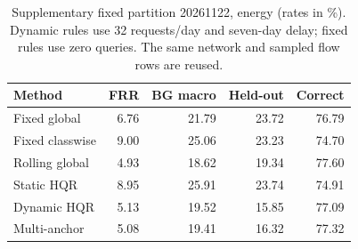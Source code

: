 \begin{table}[tbp]
\caption{Supplementary fixed partition 20261122, energy (rates in \%). Dynamic rules use 32 requests/day and seven-day delay; fixed rules use zero queries. The same network and sampled flow rows are reused.}\label{tab:revision-new-partition}
\centering\small\setlength{\tabcolsep}{4pt}
\begin{tabular}{lrrrr}
\toprule
Method & FRR & BG macro & Held-out & Correct\\\midrule
Fixed global & 6.76 & 21.79 & 23.72 & 76.79\\
Fixed classwise & 9.00 & 25.06 & 23.23 & 74.70\\
Rolling global & 4.93 & 18.62 & 19.34 & 77.60\\
Static HQR & 8.95 & 25.91 & 23.74 & 74.91\\
Dynamic HQR & 5.13 & 19.52 & 15.85 & 77.09\\
Multi-anchor & 5.08 & 19.41 & 16.32 & 77.32\\
\bottomrule\end{tabular}\end{table}
